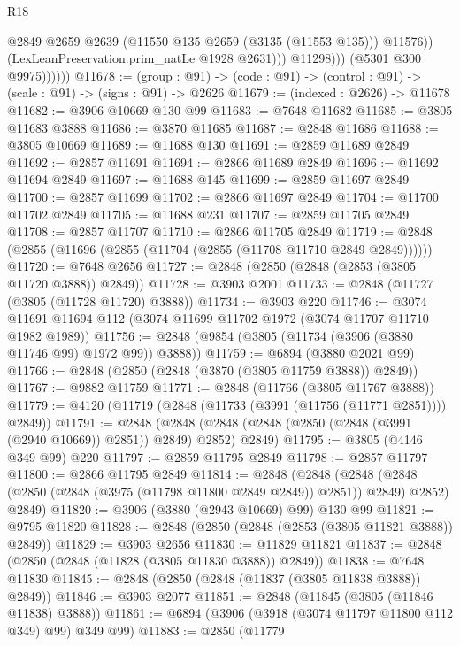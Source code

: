 \begin{lexlean}{R18}
\begin{coremodule}
                            @2849
                            @2659
                            @2639
                            (@11550 @135 @2659 (@3135 (@11553 @135)))
                            @11576))
                        (LexLeanPreservation.prim_natLe @1928 @2631)))
                    @11298)))
              (@5301 @300 @9975))))))
@11678 := (group : @91) ->
  (code : @91) -> (control : @91) -> (scale : @91) -> (signs : @91) -> @2626
@11679 := (indexed : @2626) -> @11678
@11682 := @3906 @10669 @130 @99
@11683 := @7648 @11682
@11685 := @3805 @11683 @3888
@11686 := @3870 @11685
@11687 := @2848 @11686
@11688 := @3805 @10669
@11689 := @11688 @130
@11691 := @2859 @11689 @2849
@11692 := @2857 @11691
@11694 := @2866 @11689 @2849
@11696 := @11692 @11694 @2849
@11697 := @11688 @145
@11699 := @2859 @11697 @2849
@11700 := @2857 @11699
@11702 := @2866 @11697 @2849
@11704 := @11700 @11702 @2849
@11705 := @11688 @231
@11707 := @2859 @11705 @2849
@11708 := @2857 @11707
@11710 := @2866 @11705 @2849
@11719 := @2848 (@2855 (@11696 (@2855 (@11704 (@2855 (@11708 @11710 @2849 @2849))))))
@11720 := @7648 @2656
@11727 := @2848 (@2850 (@2848 (@2853 (@3805 @11720 @3888)) @2849))
@11728 := @3903 @2001
@11733 := @2848 (@11727 (@3805 (@11728 @11720) @3888))
@11734 := @3903 @220
@11746 := @3074 @11691 @11694 @112 (@3074 @11699 @11702 @1972 (@3074 @11707 @11710 @1982 @1989))
@11756 := @2848 (@9854 (@3805 (@11734 (@3906 (@3880 @11746 @99) @1972 @99)) @3888))
@11759 := @6894 (@3880 @2021 @99)
@11766 := @2848 (@2850 (@2848 (@3870 (@3805 @11759 @3888)) @2849))
@11767 := @9882 @11759
@11771 := @2848 (@11766 (@3805 @11767 @3888))
@11779 := @4120 (@11719 (@2848 (@11733 (@3991 (@11756 (@11771 @2851)))) @2849))
@11791 := @2848
    (@2848 (@2848 (@2848 (@2850 (@2848 (@3991 (@2940 @10669)) @2851)) @2849) @2852) @2849)
@11795 := @3805 (@4146 @349 @99) @220
@11797 := @2859 @11795 @2849
@11798 := @2857 @11797
@11800 := @2866 @11795 @2849
@11814 := @2848
    (@2848
      (@2848 (@2848 (@2850 (@2848 (@3975 (@11798 @11800 @2849 @2849)) @2851)) @2849) @2852)
      @2849)
@11820 := @3906 (@3880 (@2943 @10669) @99) @130 @99
@11821 := @9795 @11820
@11828 := @2848 (@2850 (@2848 (@2853 (@3805 @11821 @3888)) @2849))
@11829 := @3903 @2656
@11830 := @11829 @11821
@11837 := @2848 (@2850 (@2848 (@11828 (@3805 @11830 @3888)) @2849))
@11838 := @7648 @11830
@11845 := @2848 (@2850 (@2848 (@11837 (@3805 @11838 @3888)) @2849))
@11846 := @3903 @2077
@11851 := @2848 (@11845 (@3805 (@11846 @11838) @3888))
@11861 := @6894 (@3906 (@3918 (@3074 @11797 @11800 @112 @349) @99) @349 @99)
@11883 := @2850
    (@11779

\end{coremodule}
\end{lexlean}
